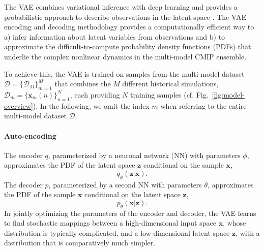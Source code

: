 \documentclass[english,a4paper,10pt]{scrartcl}
\begin{document}
The VAE combines variational inference with deep learning and provides a probabilistic approach to describe observations in the latent space \citep{Kingma.Welling.2014,Kingma.Welling.2019}. The VAE encoding and decoding methodology provides a computationally efficient way to a) infer information about latent variables from observations and b) to approximate the difficult-to-compute probability density functions (PDFs) that underlie the complex nonlinear dynamics in the multi-model CMIP ensemble.

To achieve this, the VAE is trained on samples from the multi-model dataset $\mathcal{D}=\{\mathcal{D}_{M}\}_{m=1}^{M}$ that combines the $M$ different historical simulations, $\mathcal{D}_{m}=\{\mathbf{x}_{m}(n)\}_{n=1}^{N}$, each providing $N$ training samples (cf. Fig.~\ref{fig:model-overview}). In the following, we omit the index $m$ when referring to the entire multi-model dataset $\mathcal{D}$.

\paragraph{Auto-encoding}
The encoder $q$, parameterized by a neuronal network (NN) with parameters $\phi$, approximates the PDF of the latent space $\mathbf{z}$ conditional on the sample $\mathbf{x}$,
\begin{equation}
    q_{\phi}(\mathbf{z}|\mathbf{x}).\label{eq:encoder-pdf}
\end{equation}
The decoder $p$, parameterized by a second NN with parameters $\theta$, approximates the PDF of the sample $\mathbf{x}$ conditional on the latent space $\mathbf{z}$,
\begin{equation}
    p_{\theta}(\mathbf{x}|\mathbf{z}).\label{eq:decoder-pdf}
\end{equation}
In jointly optimizing the parameters of the encoder and decoder, the VAE learns to find stochastic mappings between a high-dimensional input space $\mathbf{x}$, whose distribution is typically complicated, and a low-dimensional latent space $\mathbf{z}$, with a distribution that is comparatively much simpler.
\end{document}
